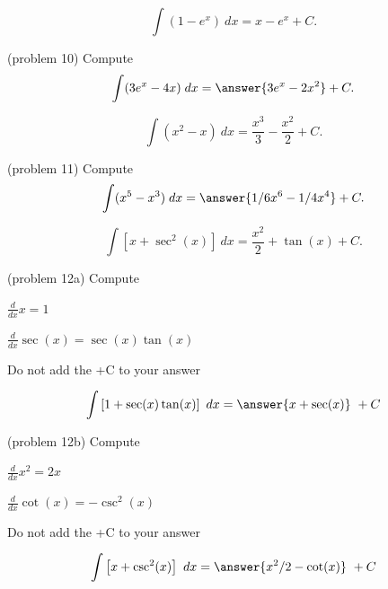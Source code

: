 \documentclass[handout]{ximera}
\begin{document}
\begin{example}[example 10]
\[
\int \left(1 - e^x\right) \ dx = x - e^x + C.
\]
\end{example}

\begin{problem}(problem 10)
Compute
\[
\int (3e^x - 4x) \; dx = \answer{3e^x - 2x^2} + C.
\]
\end{problem}



\begin{example}[example 11]
\[
\int \left(x^2 - x\right) \ dx = \dfrac{x^3}{3} - \dfrac{x^2}{2} + C.
\]
\end{example}


\begin{problem}(problem 11)
Compute
\[
\int (x^5 - x^3) \; dx = \answer{1/6 x^6 - 1/4 x^4} + C.
\]
\end{problem}




\begin{example}[example 12]
\[
\int \left[x + \sec^2(x)\right] \ dx = \frac{x^2}{2} + \tan(x) + C.
\]
\end{example}

\begin{problem}(problem 12a)
Compute


\begin{hint}
$\frac{d}{dx} x = 1$
\end{hint}
\begin{hint}
$\frac{d}{dx} \sec(x) = \sec(x)\tan(x)$
\end{hint}
\begin{hint}
Do not add the +C to your answer
\end{hint}

\[
\int \left[1 + \sec(x)\tan(x) \right] \ dx =
\answer{x + \sec(x)} \ +  C
\]
\end{problem}


\begin{problem}(problem 12b)
Compute


\begin{hint}
$\frac{d}{dx} x^2 = 2x$
\end{hint}
\begin{hint}
$\frac{d}{dx} \cot(x) = -\csc^2(x)$
\end{hint}
\begin{hint}
Do not add the +C to your answer
\end{hint}

\[
\int \left[x + \csc^2(x) \right] \ dx =
\answer{x^2 /2 - \cot(x)} \ +  C
\]
\end{problem}
\end{document}
